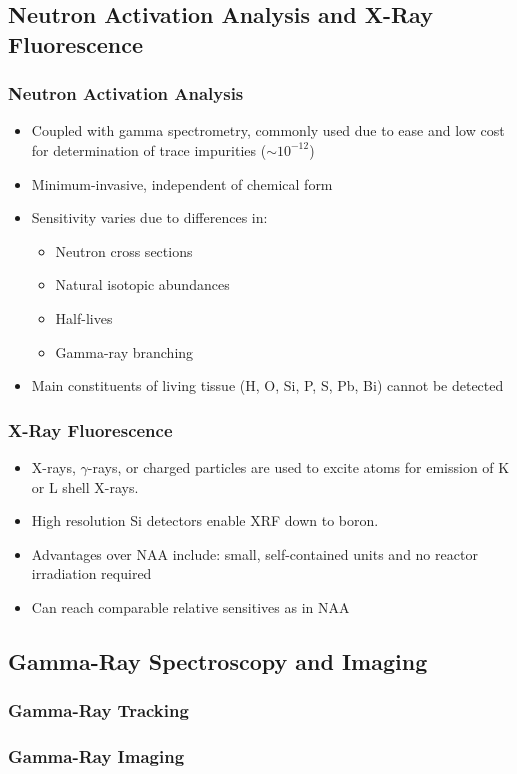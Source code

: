 \subsection{Neutron Activation Analysis and X-Ray Fluorescence}
\subsubsection{Neutron Activation Analysis}
\begin{itemize}
    \item Coupled with gamma spectrometry, commonly used due to ease and low cost for determination of trace impurities ($\sim10^{-12}$) 
    \item Minimum-invasive, independent of chemical form
    \item Sensitivity varies due to differences in: 
    \begin{itemize}
        \item Neutron cross sections
        \item Natural isotopic abundances
        \item Half-lives
        \item Gamma-ray branching
    \end{itemize}
    \item Main constituents of living tissue (H, O, Si, P, S, Pb, Bi) cannot be detected
\end{itemize}
\subsubsection{X-Ray Fluorescence}
\begin{itemize}
    \item X-rays, $\gamma$-rays, or charged particles are used to excite atoms for emission of K or L shell X-rays.
    \item High resolution Si detectors enable XRF down to boron.
    \item Advantages over NAA include: small, self-contained units and no reactor irradiation required
    \item Can reach comparable relative sensitives as in NAA
\end{itemize}
\subsection{Gamma-Ray Spectroscopy and Imaging}
\subsubsection{Gamma-Ray Tracking}
\subsubsection{Gamma-Ray Imaging}